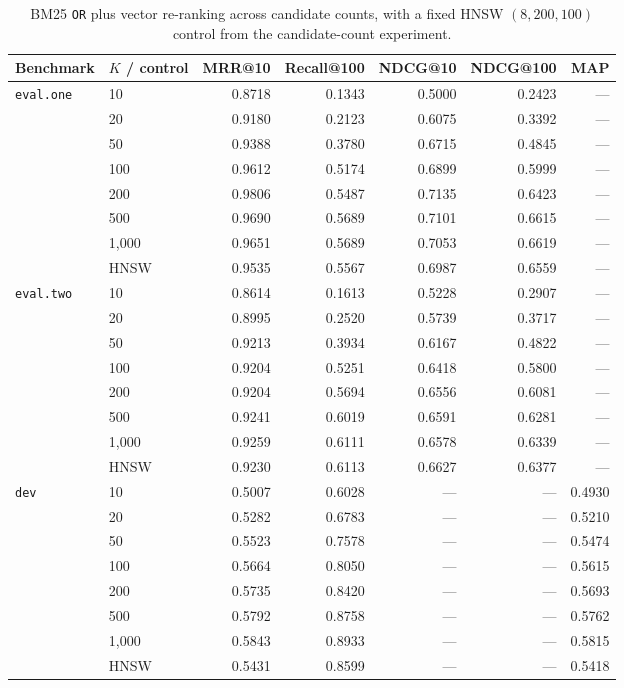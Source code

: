 \documentclass[11pt]{article}
\begin{document}
\begin{table}[H]
\centering
\small
\begin{tabular}{llrrrrr}
\toprule
\textbf{Benchmark} & \textbf{$K$ / control} & \textbf{MRR@10} & \textbf{Recall@100} & \textbf{NDCG@10} & \textbf{NDCG@100} & \textbf{MAP} \\
\midrule
\texttt{eval.one} & 10 & 0.8718 & 0.1343 & 0.5000 & 0.2423 & --- \\
 & 20 & 0.9180 & 0.2123 & 0.6075 & 0.3392 & --- \\
 & 50 & 0.9388 & 0.3780 & 0.6715 & 0.4845 & --- \\
 & 100 & 0.9612 & 0.5174 & 0.6899 & 0.5999 & --- \\
 & 200 & 0.9806 & 0.5487 & 0.7135 & 0.6423 & --- \\
 & 500 & 0.9690 & 0.5689 & 0.7101 & 0.6615 & --- \\
 & 1,000 & 0.9651 & 0.5689 & 0.7053 & 0.6619 & --- \\
 & HNSW & 0.9535 & 0.5567 & 0.6987 & 0.6559 & --- \\
\midrule
\texttt{eval.two} & 10 & 0.8614 & 0.1613 & 0.5228 & 0.2907 & --- \\
 & 20 & 0.8995 & 0.2520 & 0.5739 & 0.3717 & --- \\
 & 50 & 0.9213 & 0.3934 & 0.6167 & 0.4822 & --- \\
 & 100 & 0.9204 & 0.5251 & 0.6418 & 0.5800 & --- \\
 & 200 & 0.9204 & 0.5694 & 0.6556 & 0.6081 & --- \\
 & 500 & 0.9241 & 0.6019 & 0.6591 & 0.6281 & --- \\
 & 1,000 & 0.9259 & 0.6111 & 0.6578 & 0.6339 & --- \\
 & HNSW & 0.9230 & 0.6113 & 0.6627 & 0.6377 & --- \\
\midrule
\texttt{dev} & 10 & 0.5007 & 0.6028 & --- & --- & 0.4930 \\
 & 20 & 0.5282 & 0.6783 & --- & --- & 0.5210 \\
 & 50 & 0.5523 & 0.7578 & --- & --- & 0.5474 \\
 & 100 & 0.5664 & 0.8050 & --- & --- & 0.5615 \\
 & 200 & 0.5735 & 0.8420 & --- & --- & 0.5693 \\
 & 500 & 0.5792 & 0.8758 & --- & --- & 0.5762 \\
 & 1,000 & 0.5843 & 0.8933 & --- & --- & 0.5815 \\
 & HNSW & 0.5431 & 0.8599 & --- & --- & 0.5418 \\
\bottomrule
\end{tabular}
\caption{BM25 \texttt{OR} plus vector re-ranking across candidate counts, with a fixed HNSW $(8,200,100)$ control from the candidate-count experiment.}
\label{tab:rerank_k}
\end{table}
\end{document}

